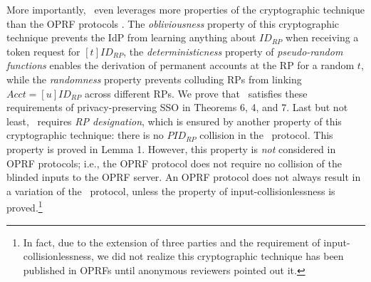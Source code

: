 More importantly, \usso\ even leverages more properties of the cryptographic technique than the OPRF protocols \cite{oprf-proved,voprf-proved,oprf-bitcoin-wallet}.
The \emph{obliviousness} property of this cryptographic technique prevents the IdP from learning anything about $ID_{RP}$ when receiving a token request for $[t]ID_{RP}$,
the \emph{deterministicness} property of \emph{pseudo-random functions} enables the derivation of permanent accounts at the RP for a random $t$,
while the \emph{randomness} property prevents colluding RPs from linking $Acct = [u]ID_{RP}$ across different RPs.
We prove that \usso\ satisfies these requirements of privacy-preserving SSO in 
    Theorems 6, 4, and 7.
Last but not least,
    \usso\ requires \emph{RP designation},
        which is ensured by another property of this cryptographic technique:
        there is no $PID_{RP}$ collision in the \usso\ protocol.
This property is proved in Lemma 1.
However, this property is \emph{not} considered in OPRF protocols;
    i.e., the OPRF protocol \cite{oprf-proved,voprf-proved,oprf-bitcoin-wallet} does not require no collision of the blinded inputs to the OPRF server.
An OPRF protocol does not always result in a variation of the \usso\ protocol,
    unless the property of input-collisionlessness is proved.\footnote{In fact, due to the extension of three parties and the requirement of input-collisionlessness, we did not realize this cryptographic technique has been published in OPRFs
        until anonymous reviewers pointed out it.}



